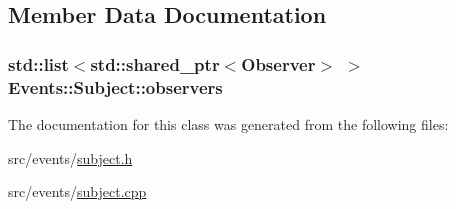 \subsection{Member Data Documentation}
\hypertarget{class_events_1_1_subject_ad3018a440e8f470384c8543412ed5c22}{}
\subsubsection[{observers}]{\setlength{\rightskip}{0pt plus 5cm}std\+::list$<$std\+::shared\+\_\+ptr$<${\bf Observer}$>$ $>$ Events\+::\+Subject\+::observers\hspace{0.3cm}{\ttfamily [private]}}\label{class_events_1_1_subject_ad3018a440e8f470384c8543412ed5c22}


The documentation for this class was generated from the following files\+:\begin{DoxyCompactItemize}
\item 
src/events/\hyperlink{subject_8h}{subject.\+h}\item 
src/events/\hyperlink{subject_8cpp}{subject.\+cpp}\end{DoxyCompactItemize}
